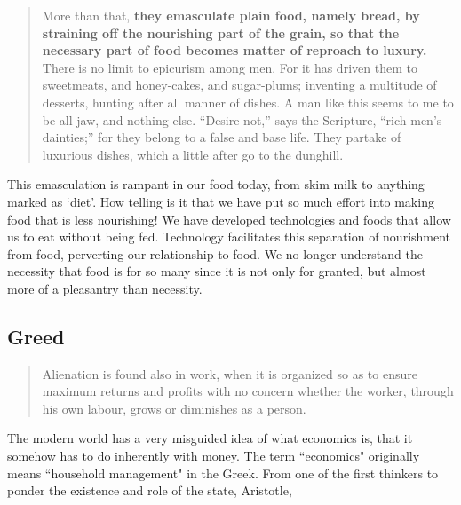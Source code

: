 \documentclass[letterpaper]{article}
\begin{document}
    \begin{quote}
      More than that, \textbf{they emasculate plain food, namely bread, by straining off the nourishing part of the grain, so that the necessary part of food becomes matter of reproach to luxury.} There is no limit to epicurism among men. For it has driven them to sweetmeats, and honey-cakes, and sugar-plums; inventing a multitude of desserts, hunting after all manner of dishes. A man like this seems to me to be all jaw, and nothing else. ``Desire not,'' says the Scripture, ``rich men’s dainties;'' for they belong to a false and base life. They partake of luxurious dishes, which a little after go to the dunghill.
    \end{quote}

    This emasculation is rampant in our food today, from skim milk to anything marked as `diet'. How telling is it that we have put so much effort into making food that is less nourishing! We have developed technologies and foods that allow us to eat without being fed. Technology facilitates this separation of nourishment from food, perverting our relationship to food. We no longer understand the necessity that food is for so many since it is not only for granted, but almost more of a pleasantry than necessity.

  \subsection{Greed}

    \begin{quote}
      Alienation is found also in work, when it is organized so as to ensure maximum returns and profits with no concern whether the worker, through his own labour, grows or diminishes as a person.
    \end{quote}

    The modern world has a very misguided idea of what economics is, that it somehow has to do inherently with money. The term ``economics" originally means ``household management" in the Greek. From one of the first thinkers to ponder the existence and role of the state, Aristotle,
\end{document}
